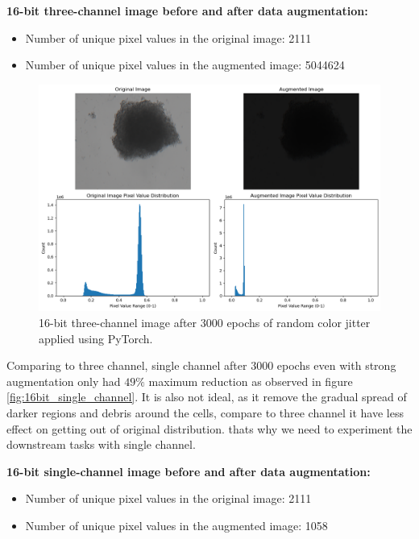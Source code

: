   \textbf{16-bit three-channel image before and after data augmentation:}
  \begin{itemize}
    \item Number of unique pixel values in the original image: 2111
    \item Number of unique pixel values in the augmented image: 5044624
  \end{itemize}
  
  \begin{figure}[H]
    \centering
    \includegraphics[scale=0.5]{figures/16bit_three_1.png} 
    \caption{16-bit three-channel image after 3000 epochs of random color jitter applied using PyTorch.}
    \label{fig:16bit_three_v1}
  \end{figure}

  Comparing to three channel, single channel after 3000 epochs even with strong augmentation only had $49\%$ maximum reduction  as observed in figure 
  \ref{fig:16bit_single_channel}. It is also not ideal, as it remove the gradual spread of darker regions and  debris around the cells, compare to three channel it
   have less effect on getting out of original distribution. thats why we need to experiment the downstream tasks with  single channel.
  
  \textbf{16-bit single-channel image before and after data augmentation:}
  \begin{itemize}
    \item Number of unique pixel values in the original image: 2111
    \item Number of unique pixel values in the augmented image: 1058
  \end{itemize}
  
